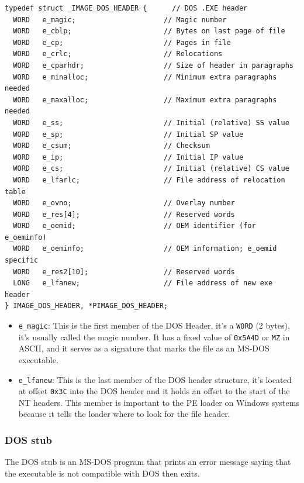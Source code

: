 \begin{verbatim}
typedef struct _IMAGE_DOS_HEADER {      // DOS .EXE header
  WORD   e_magic;                     // Magic number
  WORD   e_cblp;                      // Bytes on last page of file
  WORD   e_cp;                        // Pages in file
  WORD   e_crlc;                      // Relocations
  WORD   e_cparhdr;                   // Size of header in paragraphs
  WORD   e_minalloc;                  // Minimum extra paragraphs needed
  WORD   e_maxalloc;                  // Maximum extra paragraphs needed
  WORD   e_ss;                        // Initial (relative) SS value
  WORD   e_sp;                        // Initial SP value
  WORD   e_csum;                      // Checksum
  WORD   e_ip;                        // Initial IP value
  WORD   e_cs;                        // Initial (relative) CS value
  WORD   e_lfarlc;                    // File address of relocation table
  WORD   e_ovno;                      // Overlay number
  WORD   e_res[4];                    // Reserved words
  WORD   e_oemid;                     // OEM identifier (for e_oeminfo)
  WORD   e_oeminfo;                   // OEM information; e_oemid specific
  WORD   e_res2[10];                  // Reserved words
  LONG   e_lfanew;                    // File address of new exe header
} IMAGE_DOS_HEADER, *PIMAGE_DOS_HEADER;
\end{verbatim}

\begin{itemize}

    \item \verb+e_magic+: This is the first member of the DOS Header, it’s a \verb+WORD+ (2 bytes), it’s usually called the magic number. It has a fixed value of \verb+0x5A4D+ or \verb+MZ+ in ASCII, and it serves as a signature that marks the file as an MS-DOS executable.
    \item \verb+e_lfanew+: This is the last member of the DOS header structure, it’s located at offset \verb+0x3C+ into the DOS header and it holds an offset to the start of the NT headers. This member is important to the PE loader on Windows systems because it tells the loader where to look for the file header.
\end{itemize}

\subsubsection{DOS stub}

The DOS stub is an MS-DOS program that prints an error message saying that the executable is not compatible with DOS then exits. 

